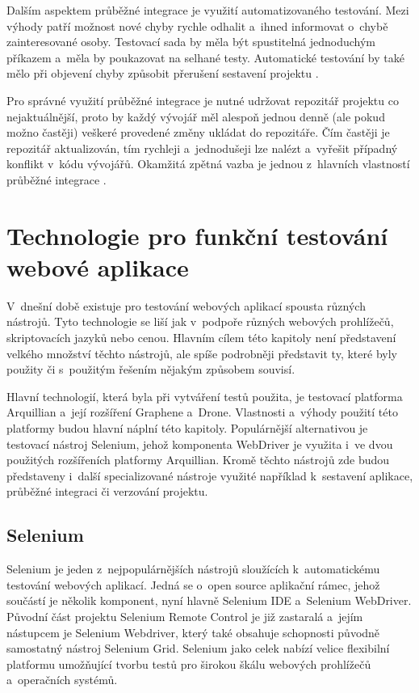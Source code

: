 \documentclass[
    color,   %
	table,   %
    twoside, %
    nolot, nolof,
]{fithesis3}
\begin{document}
Dalším aspektem průběžné integrace je využití automatizovaného testování. Mezi výhody patří možnost nové chyby rychle odhalit a~ihned informovat o~chybě zainteresované osoby. Testovací sada by měla být spustitelná jednoduchým příkazem a~měla by poukazovat na selhané testy. Automatické testování by také mělo při objevení chyby způsobit přerušení sestavení projektu \cite{Fowler}.

Pro správné využití průběžné integrace je nutné udržovat repozitář projektu co nejaktuálnější, proto by každý vývojář měl alespoň jednou denně (ale pokud možno častěji) veškeré provedené změny ukládat do repozitáře. Čím častěji je repozitář aktualizován, tím rychleji a~jednodušeji lze nalézt a~vyřešit případný konflikt v~kódu vývojářů. Okamžitá zpětná vazba je jednou z~hlavních vlastností průběžné integrace \cite{Fowler}.

\chapter{Technologie pro funkční testování webové aplikace}
\label{ch:chapter3}
V~dnešní době existuje pro testování webových aplikací spousta různých nástrojů. Tyto technologie se liší jak v~podpoře různých webových prohlížečů, skriptovacích jazyků nebo cenou. Hlavním cílem této kapitoly není představení velkého množství těchto nástrojů, ale spíše podrobněji představit ty, které byly použity či s~použitým řešením nějakým způsobem souvisí.

Hlavní technologií, která byla při vytváření testů použita, je testovací platforma Arquillian a~její rozšíření Graphene a~Drone. Vlastnosti a~výhody použití této platformy budou hlavní náplní této kapitoly. Populárnější alternativou je testovací nástroj Selenium, jehož komponenta WebDriver je využita i~ve dvou použitých rozšířeních platformy Arquillian. Kromě těchto nástrojů zde budou představeny i~další specializované nástroje využité například k~sestavení aplikace, průběžné integraci či verzování projektu.

\section{Selenium}
Selenium je jeden z~nejpopulárnějších nástrojů sloužících k~automatickému testování webových aplikací.   Jedná se o~open source aplikační rámec, jehož součástí je několik komponent, nyní hlavně Selenium IDE a~Selenium WebDriver. Původní část projektu Selenium Remote Control je již zastaralá a~jejím nástupcem je Selenium Webdriver, který také obsahuje schopnosti původně samostatný nástroj Selenium Grid. Selenium jako celek nabízí velice flexibilní platformu umožňující tvorbu testů pro širokou škálu webových prohlížečů a~operačních systémů. 
\end{document}
